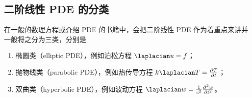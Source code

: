 \subsection{二阶线性 PDE 的分类}
在一般的数理方程或介绍 PDE 的书籍中，会把二阶线性 PDE 作为着重点来讲并一般将之分为三类，分别是
\begin{enumerate}
\item 椭圆类（elliptic PDE），例如泊松方程 $\laplacian u = f$；
\item 抛物线类（parabolic PDE），例如热传导方程 $k \laplacian T = \frac{\partial T}{\partial t}$；
\item 双曲类（hyperbolic PDE），例如波动方程 $\laplacian w = \frac{1}{c^2} \frac{\partial^2 w}{\partial t^2}$。
\end{enumerate}
